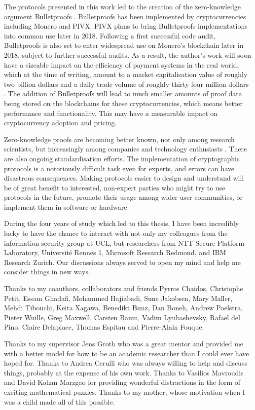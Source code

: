The protocols presented in this work led to the creation of the zero-knowledge argument Bulletproofs \cite{BunzBBPWM18}. Bulletproofs has been implemented by cryptocurrencies including Monero and PIVX. PIVX plans to bring Bulletproofs implementations into common use later in 2018. Following a first successful code audit, Bulletproofs is also set to enter widespread use on Monero's blockchain later in 2018, subject to further successful audits. As a result, the author's work will soon have a sizeable impact on the efficiency of payment systems in the real world, which at the time of writing, amount to a market capitalisation value of roughly two billion dollars and a daily trade volume of roughly thirty four million dollars \footnotemark[1]. The addition of Bulletproofs will lead to much smaller amounts of proof data being stored on the blockchains for these cryptocurrencies, which means better performance and functionality. This may have a measurable impact on cryptocurrency adoption and pricing.

Zero-knowledge proofs are becoming better known, not only among research scientists, but increasingly among companies and technology enthusiasts \footnotemark[2]. There are also ongoing standardisation efforts. The implementation of cryptographic protocols is a notoriously difficult task even for experts, and errors can have disastrous consequences. Making protocols easier to design and understand will be of great benefit to interested, non-expert parties who might try to use protocols in the future, promote their usage among wider user communities, or implement them in software or hardware.


\begin{acknowledgements}
During the four years of study which led to this thesis, I have been incredibly lucky to have the chance to interact with not only my colleagues from the information security group at UCL, but researchers from NTT Secure Platform Laboratory, Universit\'{e} Rennes 1, Microsoft Research Redmond, and IBM Research Zurich. Our discussions always served to open my mind and help me consider things in new ways.

Thanks to my coauthors, collaborators and friends Pyrros Chaidos, Christophe Petit, Essam Ghadafi, Mohammed Hajiabadi, Sune Jakobsen, Mary Maller, Mehdi Tibouchi, Keita Xagawa, Benedikt Bunz, Dan Boneh, Andrew Poelstra, Pieter Wuille, Greg Maxwell, Carsten Baum, Vadim Lyubashevsky, Rafael del Pino, Claire Delaplace, Thomas Espitau and Pierre-Alain Fouque.

Thanks to my supervisor Jens Groth who was a great mentor and provided me with a better model for how to be an academic researcher than I could ever have hoped for. Thanks to Andrea Cerulli who was always willing to help and discuss things, probably at the expense of his own work. Thanks to Vasilios Mavroudis and David Kohan Marzgao for providing wonderful distractions in the form of exciting mathematical puzzles. Thanks to my mother, whose motivation when I was a child made all of this possible.
\end{acknowledgements}

\setcounter{tocdepth}{2} 

\tableofcontents
\listoffigures
\listoftables

